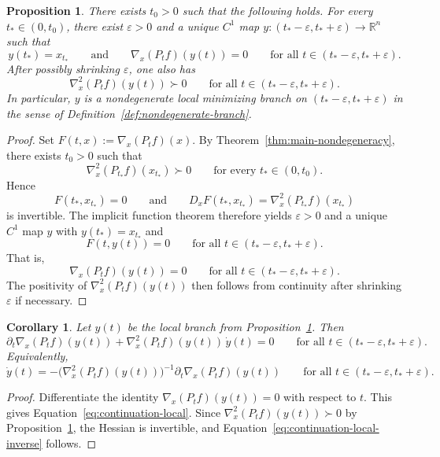 \documentclass{article}
\newtheorem{proposition}[proposition]{Proposition}
\newtheorem{corollary}[corollary]{Corollary}
\begin{document}
\begin{proposition}\label{prop:local-branch}
There exists $t_0>0$ such that the following holds. For every $t_*\in(0,t_0)$, there exist $\varepsilon>0$ and a unique $C^1$ map $y:(t_*-\varepsilon,t_*+\varepsilon)\to\mathbb R^n$ such that
$$
y(t_*)=x_{t_*}
\qquad\text{and}\qquad
\nabla_x(P_t f)(y(t))=0
\qquad\text{for all }t\in(t_*-\varepsilon,t_*+\varepsilon).
$$
After possibly shrinking $\varepsilon$, one also has
$$
\nabla_x^2(P_t f)(y(t))\succ 0
\qquad\text{for all }t\in(t_*-\varepsilon,t_*+\varepsilon).
$$
In particular, $y$ is a nondegenerate local minimizing branch on $(t_*-\varepsilon,t_*+\varepsilon)$ in the sense of Definition~\ref{def:nondegenerate-branch}.
\end{proposition}

\begin{proof}
Set $F(t,x):=\nabla_x(P_t f)(x)$. By Theorem~\ref{thm:main-nondegeneracy}, there exists $t_0>0$ such that
$$
\nabla_x^2(P_{t_*}f)(x_{t_*})\succ 0
\qquad\text{for every }t_*\in(0,t_0).
$$
Hence
$$
F(t_*,x_{t_*})=0
\qquad\text{and}\qquad
D_xF(t_*,x_{t_*})=\nabla_x^2(P_{t_*}f)(x_{t_*})
$$
is invertible. The implicit function theorem therefore yields $\varepsilon>0$ and a unique $C^1$ map $y$ with $y(t_*)=x_{t_*}$ and
$$
F(t,y(t))=0
\qquad\text{for all }t\in(t_*-\varepsilon,t_*+\varepsilon).
$$
That is,
$$
\nabla_x(P_t f)(y(t))=0
\qquad\text{for all }t\in(t_*-\varepsilon,t_*+\varepsilon).
$$
The positivity of $\nabla_x^2(P_t f)(y(t))$ then follows from continuity after shrinking $\varepsilon$ if necessary.
\end{proof}

\begin{corollary}\label{cor:continuation-equation}
Let $y(t)$ be the local branch from Proposition~\ref{prop:local-branch}. Then
\begin{equation}\label{eq:continuation-local}
\partial_t\nabla_x(P_t f)(y(t))+\nabla_x^2(P_t f)(y(t))\,\dot y(t)=0
\qquad\text{for all }t\in(t_*-\varepsilon,t_*+\varepsilon).
\end{equation}
Equivalently,
\begin{equation}\label{eq:continuation-local-inverse}
\dot y(t)=-\bigl(\nabla_x^2(P_t f)(y(t))\bigr)^{-1}\partial_t\nabla_x(P_t f)(y(t))
\qquad\text{for all }t\in(t_*-\varepsilon,t_*+\varepsilon).
\end{equation}
\end{corollary}

\begin{proof}
Differentiate the identity $\nabla_x(P_t f)(y(t))=0$ with respect to $t$. This gives Equation~\eqref{eq:continuation-local}. Since $\nabla_x^2(P_t f)(y(t))\succ 0$ by Proposition~\ref{prop:local-branch}, the Hessian is invertible, and Equation~\eqref{eq:continuation-local-inverse} follows.
\end{proof}
\end{document}
